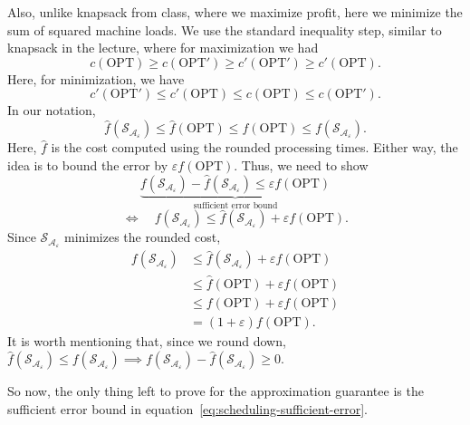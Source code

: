 \documentclass[12pt,a4paper]{article}
\theoremstyle{definition}
\theoremstyle{plain}
\begin{document}
Also, unlike knapsack from class, where we maximize profit, here we minimize
the sum of squared machine loads. We use the standard inequality step,
similar to knapsack in the lecture, where for maximization we had
\[
c(\mathrm{OPT})\geq c(\mathrm{OPT}')
\geq c'(\mathrm{OPT}')\geq c'(\mathrm{OPT}).
\]
Here, for minimization, we have
\[
c'(\mathrm{OPT}')\leq c'(\mathrm{OPT})
\leq c(\mathrm{OPT})\leq c(\mathrm{OPT}').
\]
In our notation,
\[
\widehat{f}(\mathcal{S}_{\mathcal{A}_{\varepsilon}})
\leq\widehat{f}(\mathrm{OPT})
\leq f(\mathrm{OPT})
\leq f(\mathcal{S}_{\mathcal{A}_{\varepsilon}}).
\]
Here, $\widehat{f}$ is the cost computed using the rounded processing times.
Either way, the idea is to bound the error by $\varepsilon f(\mathrm{OPT})$.
Thus, we need to show
\begin{equation}
\label{eq:scheduling-sufficient-error}
\underbrace{
f(\mathcal{S}_{\mathcal{A}_{\varepsilon}})
-\widehat{f}(\mathcal{S}_{\mathcal{A}_{\varepsilon}})
\leq\varepsilon f(\mathrm{OPT})
}_{\text{sufficient error bound}}
\end{equation}
\[
\iff\quad
f(\mathcal{S}_{\mathcal{A}_{\varepsilon}})
\leq\widehat{f}(\mathcal{S}_{\mathcal{A}_{\varepsilon}})
+\varepsilon f(\mathrm{OPT}).
\]
Since $\mathcal{S}_{\mathcal{A}_{\varepsilon}}$ minimizes the rounded cost,
\[
\begin{aligned}
f(\mathcal{S}_{\mathcal{A}_{\varepsilon}})
&\leq\widehat{f}(\mathcal{S}_{\mathcal{A}_{\varepsilon}})
+\varepsilon f(\mathrm{OPT})\\
&\leq\widehat{f}(\mathrm{OPT})+\varepsilon f(\mathrm{OPT})\\
&\leq f(\mathrm{OPT})+\varepsilon f(\mathrm{OPT})\\
&=(1+\varepsilon)f(\mathrm{OPT}).
\end{aligned}
\]
It is worth mentioning that, since we round down,
$\widehat{f}(\mathcal{S}_{\mathcal{A}_{\varepsilon}})
\leq f(\mathcal{S}_{\mathcal{A}_{\varepsilon}})
\implies
f(\mathcal{S}_{\mathcal{A}_{\varepsilon}})
-\widehat{f}(\mathcal{S}_{\mathcal{A}_{\varepsilon}})\geq0$.

So now, the only thing left to prove for the approximation guarantee is
the sufficient error bound in equation~\eqref{eq:scheduling-sufficient-error}.
\end{document}
